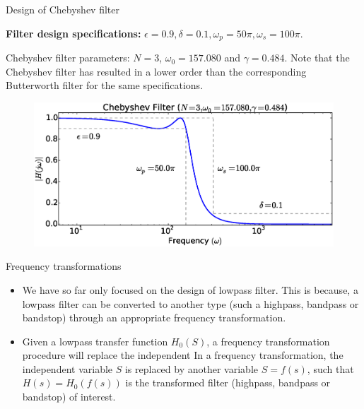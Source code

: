 \documentclass{beamer}
\begin{document}
\begin{frame}{Design of Chebyshev filter}
\begin{tiny}
\textbf{Filter design specifications:} $\epsilon=0.9, \delta = 0.1, \omega_p = 50\pi, \omega_s = 100\pi$.

Chebyshev filter parameters: $N=3$, $\omega_0=157.080$ and $\gamma = 0.484$.
Note that the Chebyshev filter has resulted in a lower order than the corresponding Butterworth filter for the same specifications.
\end{tiny}

\begin{figure}
\centering
\includegraphics[width=\textwidth]{img/cheby_filt_example.eps}
\end{figure}
\end{frame}

\begin{frame}{Frequency transformations}
\begin{itemize}
\item We have so far only focused on the design of lowpass filter. This is because, a lowpass filter can be converted to another type (such a highpass, bandpass or bandstop) through an appropriate frequency transformation.
\item Given a lowpass transfer function $H_{0}(S)$, a frequency transformation procedure will replace the independent  In a frequency transformation, the independent variable $S$ is replaced by another variable $S=f(s)$, such that $H(s) = H_{0}(f(s))$ is the transformed filter (highpass, bandpass or bandstop) of interest.
\end{itemize}
\end{frame}
\end{document}
